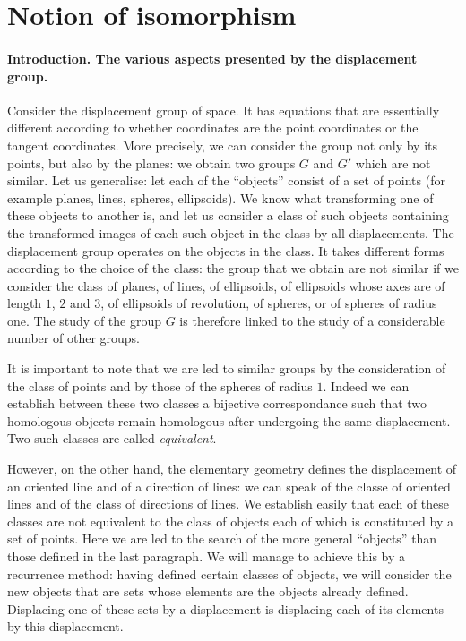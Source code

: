 \documentclass[leqno,11pt]{book}
\numberwithin{equation}{chapter}
\theoremstyle{shape1}
\theoremstyle{shapesmall}
\begin{document}
\section{Notion of isomorphism}
\label{sec:notion-isomorphism}

\paragraph{Introduction. The various aspects presented by the displacement group.}
\label{sec:89} 
Consider the displacement group of space. It has equations that are essentially different according to whether coordinates are the point coordinates or the tangent coordinates. More precisely, we can consider the group not only by its points, but also by the planes: we obtain two groups $G$ and $G'$ which are not similar. Let us generalise: let each of the ``objects'' consist of a set of points (for example planes, lines, spheres, ellipsoids). We know what transforming one of these objects to another is, and let us consider a class of such objects containing the transformed images of each such object in the class by all displacements. The displacement group operates on the objects in the class. It takes different forms according to the choice of the class: the group that we obtain are not similar if we consider the class of planes, of lines, of ellipsoids, of ellipsoids whose axes are of length $1$, $2$ and $3$, of ellipsoids of revolution, of spheres, or of spheres of radius one. The study of the group $G$ is therefore linked to the study of a considerable number of other groups.

It is important to note that we are led to similar groups by the consideration of the class of points and by those of the spheres of radius $1$. Indeed we can establish between these two classes a bijective correspondance such that two homologous objects remain homologous after undergoing the same displacement. Two such classes are called \emph{equivalent}.

However, on the other hand, the elementary geometry defines the displacement of an oriented line and of a direction of lines: we can speak of the classe of oriented lines and of the class of directions of lines. We establish easily that each of these classes are not equivalent to the class of objects each of which is constituted by a set of points. Here we are led to the search of the more general ``objects'' than those defined in the last paragraph. We will manage to achieve this by a recurrence method: having defined certain classes of objects, we will consider the new objects that are sets whose elements are the objects already defined. Displacing one of these sets by a displacement is displacing each of its elements by this displacement.
\end{document}

